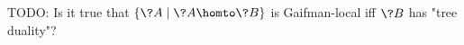 

TODO: Is it true that $\{\?A \mid \?A \homto \?B\}$ is Gaifman-local iff
$\?B$ has "tree duality"?